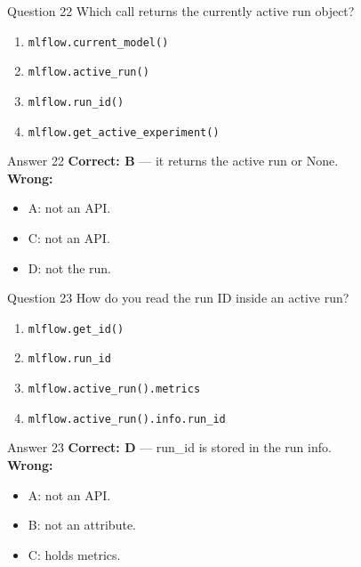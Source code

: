 \documentclass[aspectratio=169,11pt]{beamer}
\begin{document}
\begin{frame}{Question 22}
Which call returns the currently active run object?
\begin{enumerate}[label=\Alph*.]
\item \texttt{mlflow.current\_model()}
\item \texttt{mlflow.active\_run()}
\item \texttt{mlflow.run\_id()}
\item \texttt{mlflow.get\_active\_experiment()}
\end{enumerate}
\end{frame}
\begin{frame}{Answer 22}
\textbf{Correct: B} --- it returns the active run or None.\\
\vspace{0.5em}
\textbf{Wrong:}
\begin{itemize}
\item A: not an API.
\item C: not an API.
\item D: not the run.
\end{itemize}
\end{frame}

\begin{frame}{Question 23}
How do you read the run ID inside an active run?
\begin{enumerate}[label=\Alph*.]
\item \texttt{mlflow.get\_id()}
\item \texttt{mlflow.run\_id}
\item \texttt{mlflow.active\_run().metrics}
\item \texttt{mlflow.active\_run().info.run\_id}
\end{enumerate}
\end{frame}
\begin{frame}{Answer 23}
\textbf{Correct: D} --- run\_id is stored in the run info.\\
\vspace{0.5em}
\textbf{Wrong:}
\begin{itemize}
\item A: not an API.
\item B: not an attribute.
\item C: holds metrics.
\end{itemize}
\end{frame}
\end{document}

